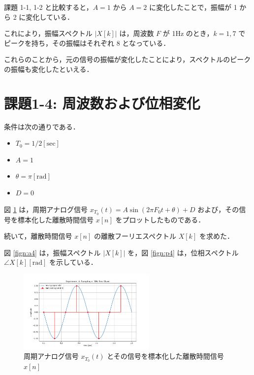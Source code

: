 \documentclass[fleqn, a4paper. 12pt]{jsarticle}
\begin{document}
    課題 1-1, 1-2 と比較すると，$A = 1$ から $A = 2$ に変化したことで，振幅が 1 から 2 に変化している．

    これにより，振幅スペクトル $|X[k]|$ は，周波数 $F$ が 1Hz のとき，$k=1, 7$ でピークを持ち，その振幅はそれぞれ 8 となっている．

    これらのことから，元の信号の振幅が変化したことにより，スペクトルのピークの振幅も変化したといえる．

  \newpage

  \section*{課題1-4: 周波数および位相変化}

  条件は次の通りである．

  \begin{itemize}
    \item $T_0 = 1/2 [\mathrm{sec}]$
    \item $A = 1$
    \item $\theta = \pi [\mathrm{rad}]$
    \item $D = 0$
  \end{itemize}

  図 \ref{fig:s4} は，周期アナログ信号 $x_{T_0}(t)=A \sin \left(2 \pi F_0 t+\theta\right)+D$ および，その信号を標本化した離散時間信号 $x[n]$ をプロットしたものである．

  続いて，離散時間信号 $x[n]$ の離散フーリエスペクトル $X[k]$ を求めた．

  図 \ref{fign:a4} は，振幅スペクトル $|X[k]|$ を，図 \ref{fign:p4} は，位相スペクトル $\angle X[k][\mathrm{rad}]$ を示している．

  \begin{figure}[!h]
    \centering
    \includegraphics[width=0.6\textwidth]{sampling_experiment_4.png}
    \caption{周期アナログ信号 $x_{T_0}(t)$ とその信号を標本化した離散時間信号 $x[n]$}
    \label{fig:s4}
  \end{figure}
\end{document}
